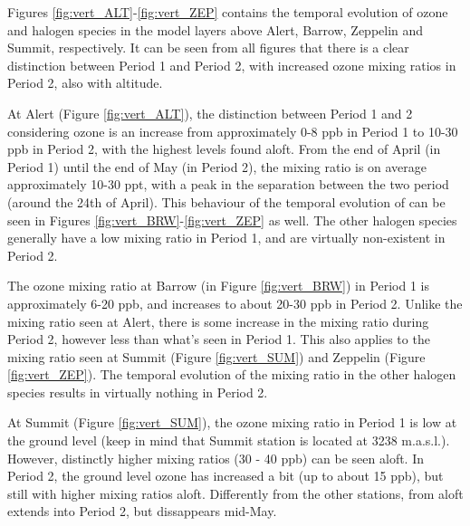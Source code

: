 %


\medskip

Figures \ref{fig:vert_ALT}-\ref{fig:vert_ZEP} contains the temporal evolution of ozone and halogen species in the model layers above Alert, Barrow, Zeppelin and Summit, respectively. It can be seen from all figures that there is a clear distinction between Period 1 and Period 2, with increased ozone mixing ratios in Period 2, also with altitude. 

\medskip

At Alert (Figure \ref{fig:vert_ALT}), the distinction between Period 1 and 2 considering ozone is an increase from approximately 0-8 ppb in Period 1 to 10-30 ppb in Period 2, with the highest levels found aloft. From the end of April (in Period 1) until the end of May (in Period 2), the  mixing ratio is on average approximately 10-30 ppt, with a peak in the separation between the two period (around the 24th of April). This behaviour of the temporal evolution of  can be seen in Figures \ref{fig:vert_BRW}-\ref{fig:vert_ZEP} as well. The other halogen species generally have a low mixing ratio in Period 1, and are virtually non-existent in Period 2. 

\medskip

The ozone mixing ratio at Barrow (in Figure \ref{fig:vert_BRW}) in Period 1 is approximately 6-20 ppb, and increases to about 20-30 ppb in Period 2. Unlike the  mixing ratio seen at Alert, there is some increase in the mixing ratio during Period 2, however less than what's seen in Period 1. This also applies to the  mixing ratio seen at Summit (Figure \ref{fig:vert_SUM}) and Zeppelin (Figure \ref{fig:vert_ZEP}). The temporal evolution of the mixing ratio in the other halogen species results in virtually nothing in Period 2.

\medskip

At Summit (Figure \ref{fig:vert_SUM}), the ozone mixing ratio in Period 1 is low at the ground level (keep in mind that Summit station is located at 3238 m.a.s.l.). However, distinctly higher mixing ratios (30 - 40 ppb) can be seen aloft. In Period 2, the ground level ozone has increased a bit (up to about 15 ppb), but still with higher mixing ratios aloft. Differently from the other stations,  from aloft extends into Period 2, but dissappears mid-May.

\medskip


